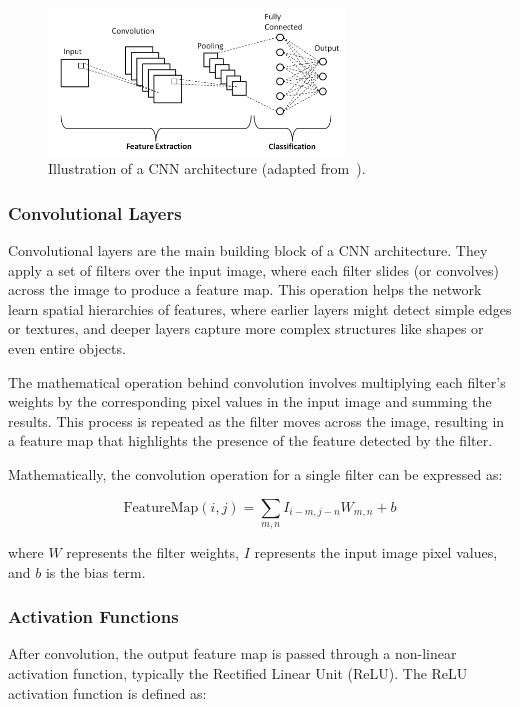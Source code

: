 \begin{figure}[h]
    \centering
    \includegraphics[width=0.7\textwidth]{img/cnn-architecture.png}
    \caption{Illustration of a CNN architecture (adapted from~\cite{phung_cloudcnn}).}\label{fig:cnn-architecture}
\end{figure}

\subsubsection{Convolutional Layers}

Convolutional layers are the main building block of a CNN architecture. They apply a set of filters over the input image, where each filter slides (or convolves) across the image to produce a feature map. This operation helps the network learn spatial hierarchies of features, where earlier layers might detect simple edges or textures, and deeper layers capture more complex structures like shapes or even entire objects.

The mathematical operation behind convolution involves multiplying each filter's weights by the corresponding pixel values in the input image and summing the results. This process is repeated as the filter moves across the image, resulting in a feature map that highlights the presence of the feature detected by the filter.

Mathematically, the convolution operation for a single filter can be expressed as:

\[
\text{FeatureMap}(i,j) = \sum_{m,n} I_{i-m,j-n} W_{m,n} + b
\]

where \(W\) represents the filter weights, \(I\) represents the input image pixel values, and \(b\) is the bias term.

\subsubsection{Activation Functions}

After convolution, the output feature map is passed through a non-linear activation function, typically the Rectified Linear Unit (ReLU). The ReLU activation function is defined as:


